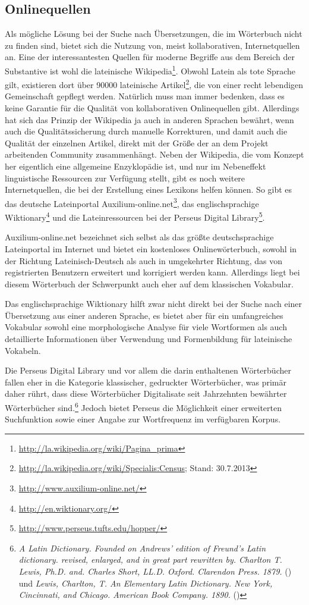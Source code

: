 \subsection{Onlinequellen}
\label{subsec:online}
Als mögliche Lösung bei der Suche nach Übersetzungen, die im Wörterbuch nicht zu finden sind, bietet sich die Nutzung von, meist  kollaborativen, Internetquellen an. Eine der interessantesten Quellen für moderne Begriffe aus dem Bereich der Substantive ist wohl die lateinische Wikipedia\footnote{\url{http://la.wikipedia.org/wiki/Pagina_prima}}. Obwohl Latein als tote Sprache gilt, existieren dort über 90000 lateinische Artikel\footnote{\url{http://la.wikipedia.org/wiki/Specialis:Census}; Stand: 30.7.2013}, die von einer recht lebendigen Gemeinschaft gepflegt werden. Natürlich muss man immer bedenken, dass es keine Garantie für die Qualität von kollaborativen Onlinequellen gibt. Allerdings hat sich das Prinzip der Wikipedia ja auch in anderen Sprachen bewährt, wenn auch die Qualitätssicherung durch manuelle Korrekturen, und damit auch die Qualität der einzelnen Artikel, direkt mit der Größe der an dem Projekt arbeitenden Community zusammenhängt. Neben der Wikipedia, die vom Konzept her eigentlich eine allgemeine Enzyklopädie ist, und nur im Nebeneffekt linguistische Ressourcen zur Verfügung stellt, gibt es noch weitere Internetquellen, die bei der Erstellung eines Lexikons helfen können. So gibt es das deutsche Lateinportal Auxilium-online.net\footnote{\url{http://www.auxilium-online.net/}}, das englischsprachige Wiktionary\footnote{\url{http://en.wiktionary.org/}} und die Lateinressourcen bei der Perseus Digital Library\footnote{\url{http://www.perseus.tufts.edu/hopper/}}. \par
Auxilium-online.net bezeichnet sich selbst als das größte deutschsprachige Lateinportal im Internet und bietet ein kostenloses Onlinewörterbuch, sowohl in der Richtung Lateinisch-Deutsch als auch in umgekehrter Richtung, das von registrierten Benutzern erweitert und korrigiert werden kann. Allerdings liegt bei diesem Wörterbuch der Schwerpunkt auch eher auf dem klassischen Vokabular. \par
Das englischsprachige Wiktionary hilft zwar nicht direkt bei der Suche nach einer Übersetzung aus einer anderen Sprache, es bietet aber für ein umfangreiches Vokabular sowohl eine morphologische Analyse für viele Wortformen als auch detaillierte Informationen über Verwendung und Formenbildung für lateinische Vokabeln. \par
Die Perseus Digital Library und vor allem die darin enthaltenen Wörterbücher fallen eher in die Kategorie klassischer, gedruckter Wörterbücher, was primär daher rührt, dass diese Wörterbücher Digitalisate seit Jahrzehnten bewährter Wörterbücher sind.\footnote{\textit{A Latin Dictionary. Founded on Andrews' edition of Freund's Latin dictionary. revised, enlarged, and in great part rewritten by. Charlton T. Lewis, Ph.D. and. Charles Short, LL.D. Oxford. Clarendon Press. 1879.} (\persalatin) und \textit{Lewis, Charlton, T. An Elementary Latin Dictionary. New York, Cincinnati, and Chicago. American Book Company. 1890.} (\perselemlat)} Jedoch bietet Perseus die Möglichkeit einer erweiterten Suchfunktion sowie einer Angabe zur Wortfrequenz im verfügbaren Korpus. \par
